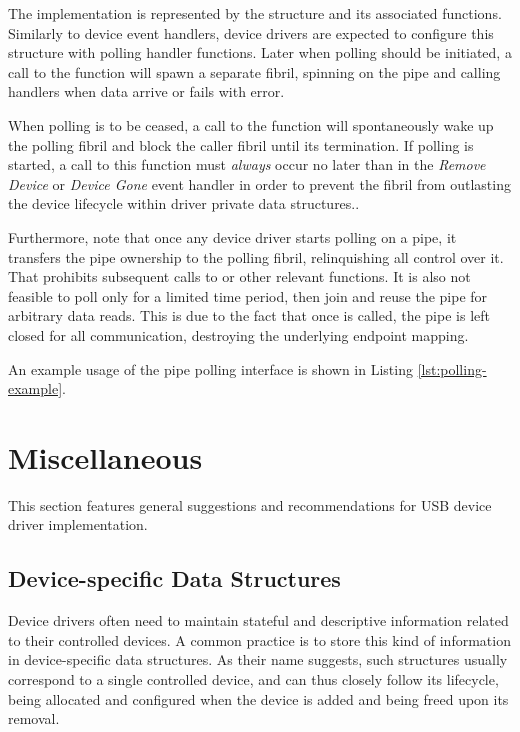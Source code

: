 The implementation is represented by the  structure and
its associated functions. Similarly to device event handlers, device drivers are
expected to configure this structure with polling handler functions. Later when
polling should be initiated, a call to the  function will
spawn a separate fibril, spinning on the pipe and calling handlers when data
arrive or  fails with error.

When polling is to be ceased, a call to the  function will
spontaneously wake up the polling fibril and block the caller fibril until its
termination. If polling is started, a call to this function must \textit{always}
occur no later than in the \textit{Remove Device} or \textit{Device Gone} event
handler in order to prevent the fibril from outlasting the device lifecycle
within driver private data structures..

Furthermore, note that once any device driver starts polling on a pipe, it
transfers the pipe ownership to the polling fibril, relinquishing all control
over it. That prohibits subsequent calls to  or other
relevant functions. It is also not feasible to poll only for a limited time
period, then join and reuse the pipe for arbitrary data reads. This is due to
the fact that once  is called, the pipe is left closed for
all communication, destroying the underlying endpoint mapping.

An example usage of the pipe polling interface is shown in Listing
\ref{lst:polling-example}.


\section{Miscellaneous}

This section features general suggestions and recommendations for USB device
driver implementation.


\subsection{Device-specific Data Structures}

Device drivers often need to maintain stateful and descriptive information
related to their controlled devices. A common practice is to store this kind of
information in device-specific data structures. As their name suggests, such
structures usually correspond to a single controlled device, and can thus
closely follow its lifecycle, being allocated and configured when the device is
added and being freed upon its removal.

